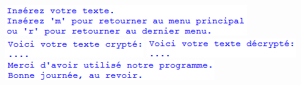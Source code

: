 \documentclass[a4paper,12pt,abstracton,titlepage]{scrartcl}
\begin{document}
{
\vspace{1cm}
\includegraphics{./Pictures/interface/french/05_french_insertText.png}	%
\vspace{1cm}
\includegraphics{./Pictures/interface/french/06_french_cryptage_showText.png}		%
\vspace{1cm}
\includegraphics{./Pictures/interface/french/06_french_decryptage_showText.png}		%
\vspace{1cm}
\includegraphics{./Pictures/interface/french/07_french_quitMessage.png}		%
}
















\end{document}

